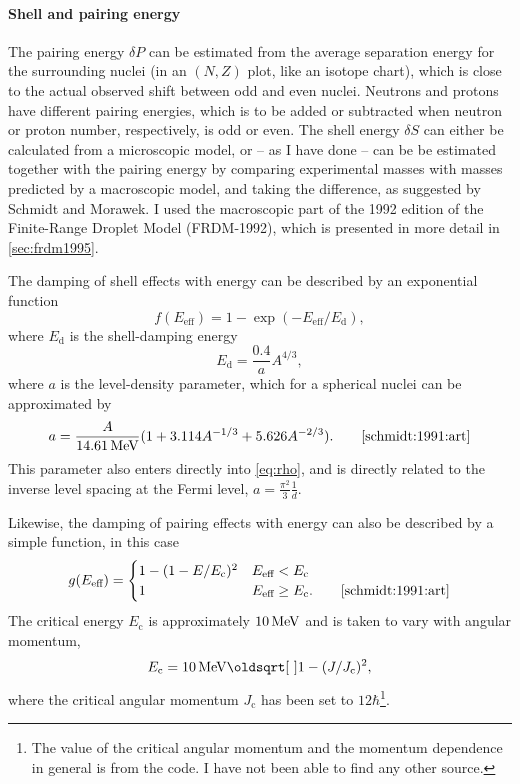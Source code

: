 \paragraph{Shell and pairing energy}
The pairing energy $\delta P$ can be estimated from the average separation energy for the surrounding nuclei (in an $(N,Z)$ plot, like an isotope chart), which is close to the actual observed shift between odd and even nuclei\cite{ericson:1960}. Neutrons and protons have different pairing energies, which is to be added or subtracted when neutron or proton number, respectively, is odd or even. 
The shell energy $\delta S$ can either be calculated from a microscopic model, or -- as I have done -- can be be estimated together with the pairing energy by comparing experimental masses with masses predicted by a macroscopic model, and taking the difference, as suggested by Schmidt and Morawek\cite{schmidt:1991:art}. I used the macroscopic part of the 1992 edition of the Finite-Range Droplet Model (FRDM-1992)\cite{moller1995}, which is presented in more detail in \autoref{sec:frdm1995}.

The damping of shell effects with energy can be described by an exponential function
\begin{equation}
f(E_\text{eff}) = 1-\exp{\left(-E_\text{eff}/E_\text{d}\right)},
\end{equation}
where $E_\text{d}$ is the shell-damping energy 
\begin{equation}
E_\text{d} = \frac{0.4}{a} A^{4/3},
\end{equation}
where $a$ is the level-density parameter, which for a spherical nuclei can be approximated by
\begin{equation}
a=\frac{A}{\unit[14.61]{MeV}}(1+3.114 A^{-1/3} + 5.626 A^{-2/3}).\qquad\cite{schmidt:1991:art}\label{eq:a}
\end{equation}
This parameter also enters directly into \eqref{eq:rho}, and is directly related to the inverse level spacing at the Fermi level, $a=\tfrac{\pi^2}{3} \tfrac{1}{d}$.

Likewise, the damping of pairing effects with energy can also be described by a simple function, in this case
\begin{equation}
g(E_\text{eff}) = \begin{cases} 1-(1-E/E_\text{c})^2 & E_\text{eff} < E_\text{c} \\
 1 & E_\text{eff} \ge E_\text{c}.\qquad\cite{schmidt:1991:art}
\end{cases}
\end{equation}
The critical energy $E_\text{c}$ is approximately $\unit[10]{MeV}$ and is taken to vary with angular momentum, 
\begin{equation}
E_\text{c} = \unit[10]{MeV}\sqrt{1-(J/J_\text{c})^2},
\end{equation}
where the critical angular momentum $J_\text{c}$ has been set to $12\hbar$\footnote{The value of the critical angular momentum and the momentum dependence in general is from the  code. I have not been able to find any other source.}. 
